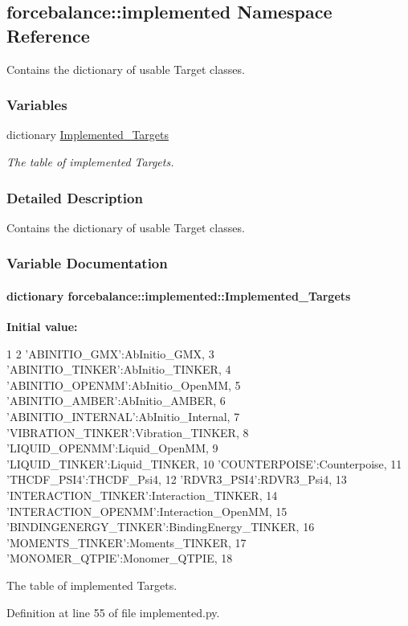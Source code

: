 \hypertarget{namespaceforcebalance_1_1implemented}{\subsection{forcebalance\-:\-:implemented \-Namespace \-Reference}
\label{namespaceforcebalance_1_1implemented}
}


\-Contains the dictionary of usable \-Target classes.  


\subsubsection*{\-Variables}
\begin{DoxyCompactItemize}
\item 
dictionary \hyperlink{namespaceforcebalance_1_1implemented_abaadb977d8de6a53b1f6bf930e5e1f0f}{\-Implemented\-\_\-\-Targets}
\begin{DoxyCompactList}\small\item\em \-The table of implemented \-Targets. \end{DoxyCompactList}\end{DoxyCompactItemize}


\subsubsection{\-Detailed \-Description}
\-Contains the dictionary of usable \-Target classes. 

\subsubsection{\-Variable \-Documentation}
\hypertarget{namespaceforcebalance_1_1implemented_abaadb977d8de6a53b1f6bf930e5e1f0f}{
\paragraph[{\-Implemented\-\_\-\-Targets}]{\setlength{\rightskip}{0pt plus 5cm}dictionary {\bf forcebalance\-::implemented\-::\-Implemented\-\_\-\-Targets}}}\label{namespaceforcebalance_1_1implemented_abaadb977d8de6a53b1f6bf930e5e1f0f}
{\bfseries \-Initial value\-:}
\begin{DoxyCode}
1 {
2     'ABINITIO_GMX':AbInitio_GMX,
3     'ABINITIO_TINKER':AbInitio_TINKER,
4     'ABINITIO_OPENMM':AbInitio_OpenMM,
5     'ABINITIO_AMBER':AbInitio_AMBER,
6     'ABINITIO_INTERNAL':AbInitio_Internal,
7     'VIBRATION_TINKER':Vibration_TINKER,
8     'LIQUID_OPENMM':Liquid_OpenMM,
9     'LIQUID_TINKER':Liquid_TINKER, 
10     'COUNTERPOISE':Counterpoise,
11     'THCDF_PSI4':THCDF_Psi4,
12     'RDVR3_PSI4':RDVR3_Psi4,
13     'INTERACTION_TINKER':Interaction_TINKER,
14     'INTERACTION_OPENMM':Interaction_OpenMM,
15     'BINDINGENERGY_TINKER':BindingEnergy_TINKER,
16     'MOMENTS_TINKER':Moments_TINKER,
17     'MONOMER_QTPIE':Monomer_QTPIE,
18     }
\end{DoxyCode}


\-The table of implemented \-Targets. 



\-Definition at line 55 of file implemented.\-py.

